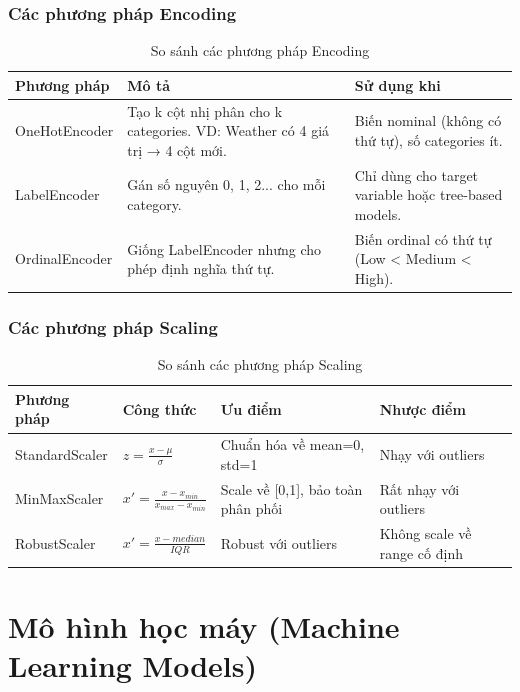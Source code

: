 \documentclass[12pt,a4paper]{article}
\begin{document}
\subsubsection{Các phương pháp Encoding}

\begin{table}[H]
\centering
\caption{So sánh các phương pháp Encoding}
\label{tab:encoding_methods}
\begin{tabular}{|l|p{5cm}|p{5.5cm}|}
\hline
\textbf{Phương pháp} & \textbf{Mô tả} & \textbf{Sử dụng khi} \\
\hline
OneHotEncoder & Tạo k cột nhị phân cho k categories. VD: Weather có 4 giá trị → 4 cột mới. & Biến nominal (không có thứ tự), số categories ít. \\
\hline
LabelEncoder & Gán số nguyên 0, 1, 2... cho mỗi category. & Chỉ dùng cho target variable hoặc tree-based models. \\
\hline
OrdinalEncoder & Giống LabelEncoder nhưng cho phép định nghĩa thứ tự. & Biến ordinal có thứ tự (Low < Medium < High). \\
\hline
\end{tabular}
\end{table}

\subsubsection{Các phương pháp Scaling}

\begin{table}[H]
\centering
\caption{So sánh các phương pháp Scaling}
\label{tab:scaling_methods}
\begin{tabular}{|l|p{3.5cm}|p{3.5cm}|p{3.5cm}|}
\hline
\textbf{Phương pháp} & \textbf{Công thức} & \textbf{Ưu điểm} & \textbf{Nhược điểm} \\
\hline
StandardScaler & $z = \frac{x - \mu}{\sigma}$ & Chuẩn hóa về mean=0, std=1 & Nhạy với outliers \\
\hline
MinMaxScaler & $x' = \frac{x - x_{min}}{x_{max} - x_{min}}$ & Scale về [0,1], bảo toàn phân phối & Rất nhạy với outliers \\
\hline
RobustScaler & $x' = \frac{x - median}{IQR}$ & Robust với outliers & Không scale về range cố định \\
\hline
\end{tabular}
\end{table}

\section{Mô hình học máy (Machine Learning Models)}
\end{document}
